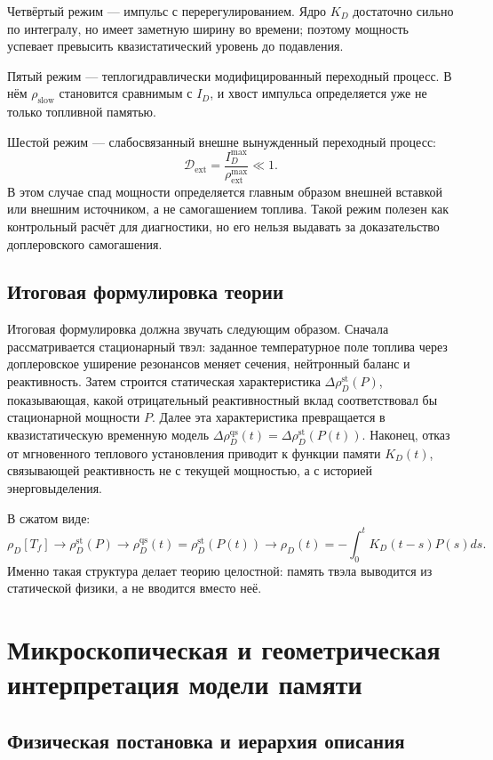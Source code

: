 \documentclass[12pt]{article}
\begin{document}
Четвёртый режим --- импульс с перерегулированием. Ядро \(K_D\) достаточно сильно по интегралу, но имеет заметную ширину во времени; поэтому мощность успевает превысить квазистатический уровень до подавления.

Пятый режим --- теплогидравлически модифицированный переходный процесс. В нём \(\rho_{\mathrm{slow}}\) становится сравнимым с \(I_D\), и хвост импульса определяется уже не только топливной памятью.

Шестой режим --- слабосвязанный внешне вынужденный переходный процесс:
\[
\mathcal D_{\mathrm{ext}}
=
\frac{I_D^{\max}}{\rho_{\mathrm{ext}}^{\max}}
\ll1.
\]
В этом случае спад мощности определяется главным образом внешней вставкой или внешним источником, а не самогашением топлива. Такой режим полезен как контрольный расчёт для диагностики, но его нельзя выдавать за доказательство доплеровского самогашения.

\subsection{Итоговая формулировка теории}

Итоговая формулировка должна звучать следующим образом. Сначала рассматривается стационарный твэл: заданное температурное поле топлива через доплеровское уширение резонансов меняет сечения, нейтронный баланс и реактивность. Затем строится статическая характеристика \(\Delta\rho_D^{\mathrm{st}}(P)\), показывающая, какой отрицательный реактивностный вклад соответствовал бы стационарной мощности \(P\). Далее эта характеристика превращается в квазистатическую временную модель \(\Delta\rho_D^{\mathrm{qs}}(t)=\Delta\rho_D^{\mathrm{st}}(P(t))\). Наконец, отказ от мгновенного теплового установления приводит к функции памяти \(K_D(t)\), связывающей реактивность не с текущей мощностью, а с историей энерговыделения.

В сжатом виде:
\[
\boxed{
\rho_D[T_f]
\rightarrow
\rho_D^{\mathrm{st}}(P)
\rightarrow
\rho_D^{\mathrm{qs}}(t)=\rho_D^{\mathrm{st}}(P(t))
\rightarrow
\rho_D(t)=-\int_0^tK_D(t-s)P(s)ds.
}
\]
Именно такая структура делает теорию целостной: память твэла выводится из статической физики, а не вводится вместо неё.

\section{Микроскопическая и геометрическая интерпретация модели памяти}

\subsection{Физическая постановка и иерархия описания}
\end{document}
